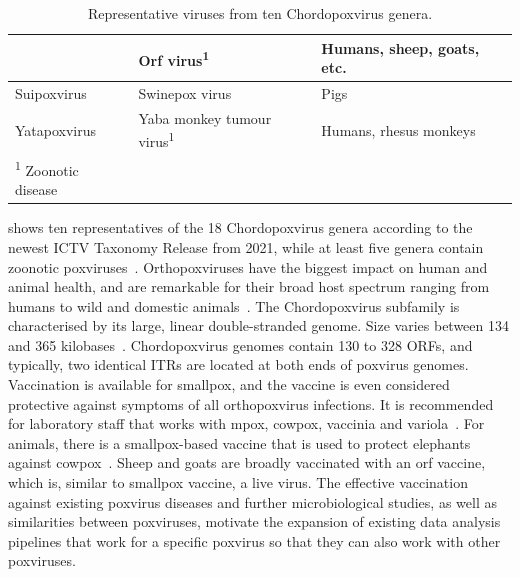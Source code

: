 \begin{table}[H]
\begin{tabular}{lll}
						& Orf virus\textsuperscript{1}                    & Humans, sheep, goats, etc.                  \\ \midrule
	Suipoxvirus         & Swinepox virus                                  & Pigs                                        \\ \midrule
	Yatapoxvirus        & Yaba monkey tumour virus\textsuperscript{1}     & Humans, rhesus monkeys                      \\ \bottomrule
	\textsuperscript{1} Zoonotic disease &                                &                                             \\
	\end{tabular}
	\caption{Representative viruses from ten Chordopoxvirus genera.}
	\label{tab:2-chordopox}
\end{table}

 shows ten representatives of the 18 Chordopoxvirus genera according to the newest \ac{ICTV} Taxonomy Release from 2021, while at least five genera contain zoonotic poxviruses~\cite{tax2021virus}. Orthopoxviruses have the biggest impact on human and animal health, and are remarkable for their broad host spectrum ranging from humans to wild and domestic animals~\cite{fenner2000adventures}.
The Chordopoxvirus subfamily is characterised by its large, linear double-stranded genome. Size varies between 134 and 365 kilobases~\cite{brunetti2003complete, tulman2004genome}. Chordopoxvirus genomes contain 130 to 328 \acp{ORF}, and typically, two identical \acp{ITR} are located at both ends of poxvirus genomes. \\
Vaccination is available for smallpox, and the vaccine is even considered protective against symptoms of all orthopoxvirus infections. It is recommended for laboratory staff that works with mpox, cowpox, vaccinia and variola~\cite{cono2003smallpox}. For animals, there is a smallpox-based vaccine that is used to protect elephants against cowpox~\cite{kurth2008rat}. Sheep and goats are broadly vaccinated with an orf vaccine, which is, similar to smallpox vaccine, a live virus. The effective vaccination against existing poxvirus diseases and further microbiological studies, as well as similarities between poxviruses, motivate the expansion of existing data analysis pipelines that work for a specific poxvirus so that they can also work with other poxviruses.

